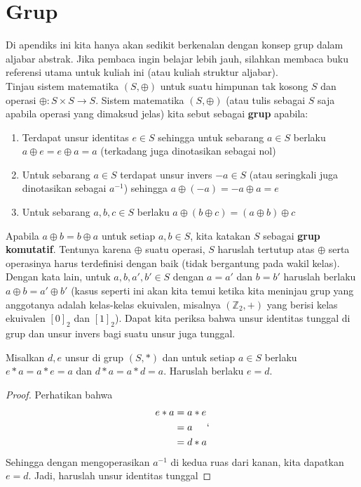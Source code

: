 \chapter{Grup}
	Di apendiks ini kita hanya akan sedikit berkenalan dengan konsep grup dalam aljabar abstrak. Jika pembaca ingin belajar lebih jauh, silahkan membaca buku referensi utama untuk kuliah ini (atau kuliah struktur aljabar). \\
	
	Tinjau sistem matematika $(S,\oplus)$ untuk suatu himpunan tak kosong $S$ dan operasi $\oplus: S \times S \rightarrow S$. Sistem matematika $(S, \oplus)$ (atau tulis sebagai $S$ saja apabila operasi yang dimaksud jelas) kita sebut sebagai \textbf{grup} apabila:
	\begin{enumerate}
		\item Terdapat unsur identitas $e \in S$ sehingga untuk sebarang $a \in S$ berlaku $a \oplus e = e \oplus a = a$ (terkadang juga dinotasikan sebagai nol)
		\item Untuk sebarang $a \in S$ terdapat unsur invers $-a \in S$ (atau seringkali juga dinotasikan sebagai $a^{-1}$) sehingga $a \oplus (-a) = -a \oplus a = e$
		\item Untuk sebarang $a,b,c \in S$ berlaku $a \oplus (b \oplus c) = (a \oplus b) \oplus c$
	\end{enumerate}
	Apabila $a \oplus b = b \oplus a$ untuk setiap $a,b \in S$, kita katakan $S$ sebagai \textbf{grup komutatif}. Tentunya karena $\oplus$ suatu operasi, $S$ haruslah tertutup atas $\oplus$ serta operasinya harus terdefinisi dengan baik (tidak bergantung pada wakil kelas). Dengan kata lain, untuk $a,b,a',b' \in S$ dengan $a = a'$ dan $b = b'$ haruslah berlaku $a \oplus b = a' \oplus b'$ (kasus seperti ini akan kita temui ketika kita meninjau grup yang anggotanya adalah kelas-kelas ekuivalen, misalnya $(\mathbb{Z}_2, +)$ yang berisi kelas ekuivalen $[0]_2$ dan $[1]_2$). Dapat kita periksa bahwa unsur identitas tunggal di grup dan unsur invers bagi suatu unsur juga tunggal.
	\begin{theorem}
	Misalkan $d,e$ unsur di grup $(S,*)$ dan untuk setiap $a \in S$ berlaku $e * a = a * e = a$ dan $d * a = a * d = a$. Haruslah berlaku $e = d$.
	\end{theorem}
	\begin{proof}
		 Perhatikan bahwa \begin{equation*}
		\begin{split}
		e * a &= a * e \\
		&= a\\
		&= d * a\\
		\end{split}`
		\end{equation*}	
		Sehingga dengan mengoperasikan $a^{-1}$ di kedua ruas dari kanan, kita dapatkan $e = d$. Jadi, haruslah unsur identitas tunggal
	\end{proof}
